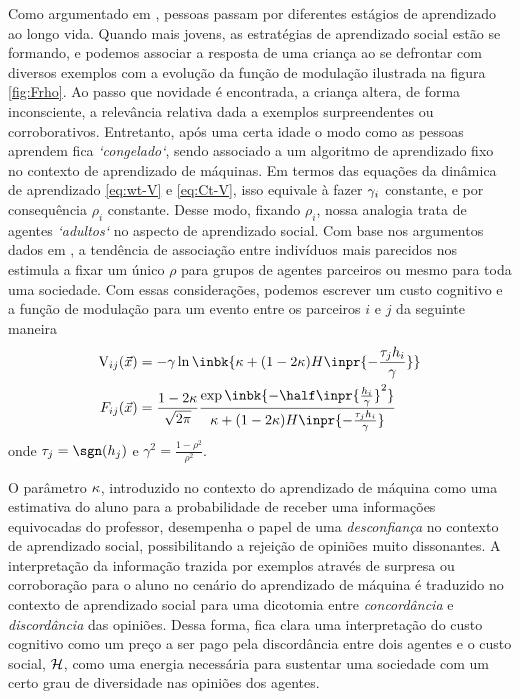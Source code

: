 Como argumentado em \parencite{Cesar2014}, pessoas passam por
diferentes estágios de aprendizado ao longo vida.  Quando mais jovens,
as estratégias de aprendizado social estão se formando, e podemos
associar a resposta de uma criança ao se defrontar com diversos
exemplos com a evolução da função de modulação ilustrada na figura
\ref{fig:Frho}. Ao passo que novidade é encontrada, a criança altera,
de forma inconsciente, a relevância relativa dada a exemplos
surpreendentes ou corroborativos.  Entretanto, após uma certa idade o
modo como as pessoas aprendem fica \emph{`congelado`}, sendo associado
a um algoritmo de aprendizado fixo no contexto de aprendizado de
máquinas.  Em termos das equações da dinâmica de aprendizado
\eqref{eq:wt-V} e \eqref{eq:Ct-V}, isso equivale à fazer $\gamma_i$
constante, e por consequência $\rho_i$ constante. Desse modo, fixando
$\rho_i$, nossa analogia trata de agentes \emph{`adultos`} no aspecto
de aprendizado social.  Com base nos argumentos dados em
\parencite{Caticha2011}, a tendência de associação entre indivíduos
mais parecidos nos estimula a fixar um único $\rho$ para grupos de
agentes parceiros ou mesmo para toda uma sociedade.
\newcommand{\Vab}[2]{\ensuremath{\cogcost_{#1#2}}}
\newcommand{\gm}{\ensuremath{\gamma}}
\newcommand{\stb}{\ensuremath{\frac{\tau_j h_i}{\gm}}} Com essas
considerações, podemos escrever um custo cognitivo e a função de
modulação para um evento entre os parceiros $i$ e $j$ da seguinte
maneira
\begin{align}
    \Vab{i}{j}(\vec{x}) & = -\gm\ln\inbk{\ns + (1-2\ns)H\inpr{-\stb}}
    \label{eq:Vij}  \\
    F_{ij}(\vec{x}) & = \frac{1 - 2\ns}{\sqrt{2\pi}}
    \frac{\exp\inbk{-\half\inpr{\frac{h_i}{\gm}}^2}}{\ns + (1-2\ns)H\inpr{-\stb}}
 \label{eq:Fij}
\end{align}
onde $\tau_j = \sgn(h_j)$ e $\gm^2 = \frac{1-\rho^2}{\rho^2}$.

O parâmetro $\kappa$, introduzido no contexto do aprendizado de máquina
como uma estimativa do aluno para a probabilidade de receber uma
informações equivocadas do professor, desempenha o papel de uma
\emph{desconfiança} no contexto de aprendizado social, possibilitando
a rejeição de opiniões muito dissonantes.  A interpretação da informação
trazida por exemplos através de surpresa ou corroboração para o aluno
no cenário do aprendizado de máquina é traduzido no contexto de
aprendizado social para uma dicotomia entre \emph{concordância} e
\emph{discordância} das opiniões.  Dessa forma, fica clara uma
interpretação do custo cognitivo como um preço a ser pago pela
discordância entre dois agentes e o custo social, ${\mathcal{H}}$, como uma
energia necessária para sustentar uma sociedade com um certo grau de
diversidade nas opiniões dos agentes.

